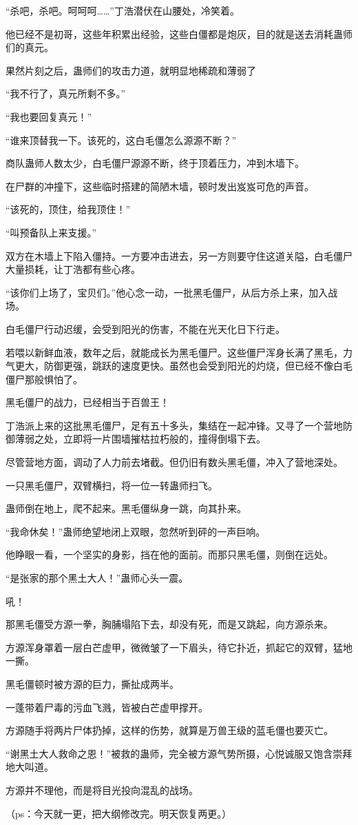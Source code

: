 \begin{this_body}
“杀吧，杀吧。呵呵呵……”丁浩潜伏在山腰处，冷笑着。

他已经不是初哥，这些年积累出经验，这些白僵都是炮灰，目的就是送去消耗蛊师们的真元。

果然片刻之后，蛊师们的攻击力道，就明显地稀疏和薄弱了

“我不行了，真元所剩不多。”

“我也要回复真元！”

“谁来顶替我一下。该死的，这白毛僵怎么源源不断？”

商队蛊师人数太少，白毛僵尸源源不断，终于顶着压力，冲到木墙下。

在尸群的冲撞下，这些临时搭建的简陋木墙，顿时发出岌岌可危的声音。

“该死的，顶住，给我顶住！”

“叫预备队上来支援。”

双方在木墙上下陷入僵持。一方要冲击进去，另一方则要守住这道关隘，白毛僵尸大量损耗，让丁浩都有些心疼。

“该你们上场了，宝贝们。”他心念一动，一批黑毛僵尸，从后方杀上来，加入战场。

白毛僵尸行动迟缓，会受到阳光的伤害，不能在光天化日下行走。

若喂以新鲜血液，数年之后，就能成长为黑毛僵尸。这些僵尸浑身长满了黑毛，力气更大，防御更强，跳跃的速度更快。虽然也会受到阳光的灼烧，但已经不像白毛僵尸那般惧怕了。

黑毛僵尸的战力，已经相当于百兽王！

丁浩派上来的这批黑毛僵尸，足有五十多头，集结在一起冲锋。又寻了一个营地防御薄弱之处，立即将一片围墙摧枯拉朽般的，撞得倒塌下去。

尽管营地方面，调动了人力前去堵截。但仍旧有数头黑毛僵，冲入了营地深处。

一只黑毛僵尸，双臂横扫，将一位一转蛊师扫飞。

蛊师倒在地上，爬不起来。黑毛僵纵身一跳，向其扑来。

“我命休矣！”蛊师绝望地闭上双眼，忽然听到砰的一声巨响。

他睁眼一看，一个坚实的身影，挡在他的面前。而那只黑毛僵，则倒在远处。

“是张家的那个黑土大人！”蛊师心头一震。

吼！

那黑毛僵受方源一拳，胸脯塌陷下去，却没有死，而是又跳起，向方源杀来。

方源浑身罩着一层白芒虚甲，微微皱了一下眉头，待它扑近，抓起它的双臂，猛地一撕。

黑毛僵顿时被方源的巨力，撕扯成两半。

一蓬带着尸毒的污血飞溅，皆被白芒虚甲撑开。

方源随手将两片尸体扔掉，这样的伤势，就算是万兽王级的蓝毛僵也要灭亡。

“谢黑土大人救命之恩！”被救的蛊师，完全被方源气势所摄，心悦诚服又饱含崇拜地大叫道。

方源并不理他，而是将目光投向混乱的战场。

（ps：今天就一更，把大纲修改完。明天恢复两更。）

\end{this_body}

